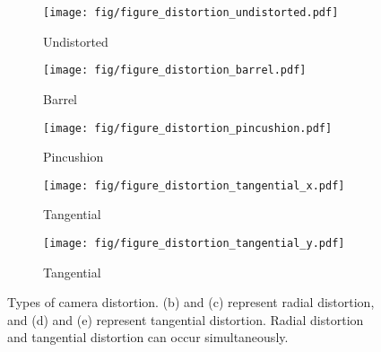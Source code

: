         \begin{figure}[t]
        	\begin{center}
        		\captionsetup{justification=centering}
        		\begin{subfigure}[t]{0.23\linewidth}
        			\centering
        			\texttt{[image: fig/figure\_distortion\_undistorted.pdf]}
        			\vspace{-6mm}
        			\caption{\footnotesize Undistorted}
        		\end{subfigure}
        		\begin{subfigure}[t]{0.23\linewidth}
        			\centering
        			\texttt{[image: fig/figure\_distortion\_barrel.pdf]}
        			\vspace{-6mm}
        			\caption{\footnotesize Barrel}
        		\end{subfigure}
        		\begin{subfigure}[t]{0.23\linewidth}
        			\centering
        			\texttt{[image: fig/figure\_distortion\_pincushion.pdf]}
        			\vspace{-6mm}
        			\caption{\footnotesize Pincushion}
        		\end{subfigure}
    
        		\begin{subfigure}[t]{0.23\linewidth}
        			\centering
        			\texttt{[image: fig/figure\_distortion\_tangential\_x.pdf]}
        			\vspace{-6mm}
        			\caption{\footnotesize Tangential }
        		\end{subfigure}
        		\begin{subfigure}[t]{0.23\linewidth}
        			\centering
        			\texttt{[image: fig/figure\_distortion\_tangential\_y.pdf]}
        			\vspace{-6mm}
        			\caption{\footnotesize Tangential }
        		\end{subfigure}
        	\end{center}
        	    \vspace{-4mm}
        		\caption{Types of camera distortion. (b) and (c) represent radial distortion, and (d) and (e) represent tangential distortion. Radial distortion and tangential distortion can occur simultaneously.}
        		\vspace{-4mm}
        	\label{fig:camera distortion}
        \end{figure}
        \vspace{-2mm}

